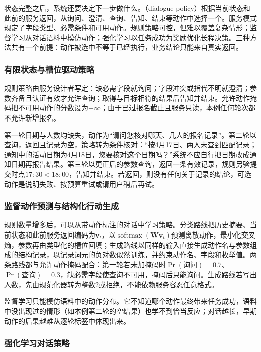 状态完整之后，系统还要决定下一步做什么。（dialogue policy）根据当前状态和此前的服务返回，从询问、澄清、查询、告知、结束等动作中选择一个。服务模式规定了字段类型、必需条件和可用动作。规则策略可控，但难以覆盖复杂情形；监督学习从对话语料中模仿动作；强化学习以任务成功为奖励优化长程决策。三种方法共有一个前提：动作被选中不等于已经执行，业务结论只能来自真实返回。

\subsubsection{有限状态与槽位驱动策略}
\label{sec:nlp-dialogue-rule-policy}

规则策略由服务设计者写定：缺必需字段就询问；字段冲突或指代不明就澄清；参数齐备且认证有效才允许查询；取得与目标相符的结果后告知并结束。允许动作掩码把不可用动作的分数设为$-\infty$；由于已过报名截止且服务只读，本例任何轮次都不允许新增报名。

第一轮日期与人数均缺失，动作为“请问您核对哪天、几人的报名记录”。第二轮以查询，返回且记录为空，策略转为条件核对：“按4月17日、两人未查到匹配记录；通知中的活动日期为4月18日，您要核对这个日期吗？”系统不应自行把日期改成通知日期再报告结果。第三轮以更正后的参数查询，返回一条有效记录，规则另验提交时点$17{:}30<18{:}00$，告知并结束。若返回，则没有任何关于记录的结论，可选动作是说明失败、按预算重试或请用户稍后再试。

\subsubsection{监督动作预测与结构化行动生成}
\label{sec:nlp-dialogue-learned-policy}

规则数量增多后，可以从带动作标注的对话中学习策略。分类路线把历史摘要、当前状态和此前服务返回编码为$\bm{v}_t$，以$\operatorname{softmax}(\bm{W}\bm{v}_t)$预测离散动作，最小化交叉熵，参数再由类型化的槽位回填；生成路线以同样的输入直接生成动作名与参数组成的结构记录，以记录词元的负对数似然训练，并约束动作名、字段和枚举值。两条路线都与允许动作掩码配合：第一轮若未加掩码时$\Pr(\text{询问})=0.7$、$\Pr(\text{查询})=0.3$，缺必需字段使查询不可用，掩码后只能询问。生成路线若写出人数，先由规范化器转为整数2或拒绝，不能依赖服务容忍任意格式。

监督学习只能模仿语料中的动作分布。它不知道哪个动作最终带来任务成功，语料中没出现过的情形（如本例第二轮的空结果）也学不到恰当反应；对话越长，早期动作的后果越难从逐轮标签中体现出来。

\subsubsection{强化学习对话策略}
\label{sec:nlp-dialogue-rl-policy}

